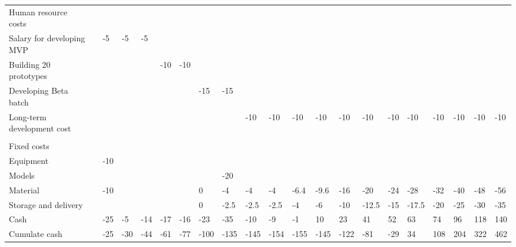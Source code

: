 \documentclass[12pt,twoside]{article}
\begin{document}
\begin{table}[]
\begin{tabular}{lllllllllllllllllllll}
    Human resource costs         &  &     &     &     &     &     &      &      &      &      &      &      &      &       &       &       &       &       &       &       \\
    Salary for developing MVP    &  & -5  & -5  & -5  &     &     &      &      &      &      &      &      &      &       &       &       &       &       &       &       \\
    Building 20 prototypes       &  &     &     &     & -10 & -10 &      &      &      &      &      &      &      &       &       &       &       &       &       &       \\
    Developing Beta batch        &  &     &     &     &     &     & -15  & -15  &      &      &      &      &      &       &       &       &       &       &       &       \\
    Long-term development cost   &  &     &     &     &     &     &      &      & -10  & -10  & -10  & -10  & -10  & -10   & -10   & -10   & -10   & -10   & -10   & -10   \\
                                 &  &     &     &     &     &     &      &      &      &      &      &      &      &       &       &       &       &       &       &       \\
    Fixed costs                  &  &     &     &     &     &     &      &      &      &      &      &      &      &       &       &       &       &       &       &       \\
    Equipment                    &  & -10 &     &     &     &     &      &      &      &      &      &      &      &       &       &       &       &       &       &       \\
    Models                       &  &     &     &     &     &     &      & -20  &      &      &      &      &      &       &       &       &       &       &       &       \\
    Material                     &  & -10 &     &     &     &     & 0    & -4   & -4   & -4   & -6.4 & -9.6 & -16  & -20   & -24   & -28   & -32   & -40   & -48   & -56   \\
    Storage and delivery         &  &     &     &     &     &     & 0    & -2.5 & -2.5 & -2.5 & -4   & -6   & -10  & -12.5 & -15   & -17.5 & -20   & -25   & -30   & -35   \\
    Cash                         &  & -25 & -5  & -14 & -17 & -16 & -23  & -35  & -10  & -9   & -1   & 10   & 23   & 41    & 52    & 63    & 74    & 96    & 118   & 140   \\
    Cumulate cash                &  & -25 & -30 & -44 & -61 & -77 & -100 & -135 & -145 & -154 & -155 & -145 & -122 & -81   & -29   & 34    & 108   & 204   & 322   & 462  
    \end{tabular}
    \label{chart:Financial detail}
    \end{table}
\end{document}
